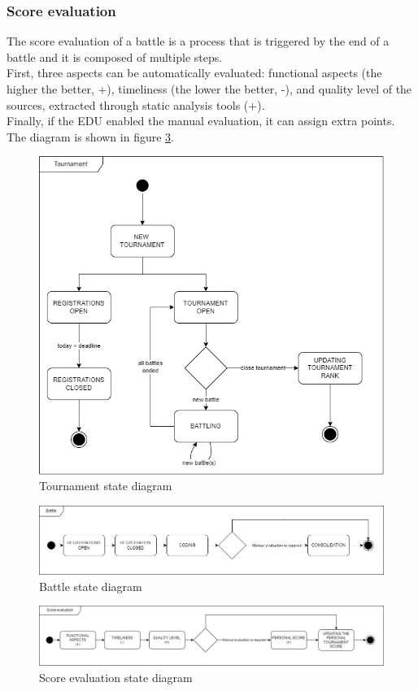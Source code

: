 \subsubsection*{Score evaluation}
The score evaluation of a battle is a process that is triggered by the end of a battle and it is composed of multiple steps.\\
First, three aspects can be automatically evaluated: functional aspects (the higher the better, +), timeliness (the lower the better, -), and quality level of the sources, extracted through static analysis tools (+). \\
Finally, if the EDU enabled the manual evaluation, it can assign extra points. \\
The diagram is shown in figure \ref{fig:score-evaluation-state-diagram}.

\begin{figure}[H]
    \centering
    \includegraphics[width=.8\textwidth]{images/state_diagrams/tournament.jpg}
    \caption{Tournament state diagram}
    \label{fig:tournament-state-diagram}
\end{figure}
\begin{figure}[H]
    \centering
    \includegraphics[width=1\textwidth]{images/state_diagrams/battle.jpg}
    \caption{Battle state diagram}
    \label{fig:battle-state-diagram}
\end{figure}
\begin{figure}[H]
    \centering
    \includegraphics[width=1\textwidth]{images/state_diagrams/score_evaluation.jpg}
    \caption{Score evaluation state diagram}
    \label{fig:score-evaluation-state-diagram}
\end{figure}

